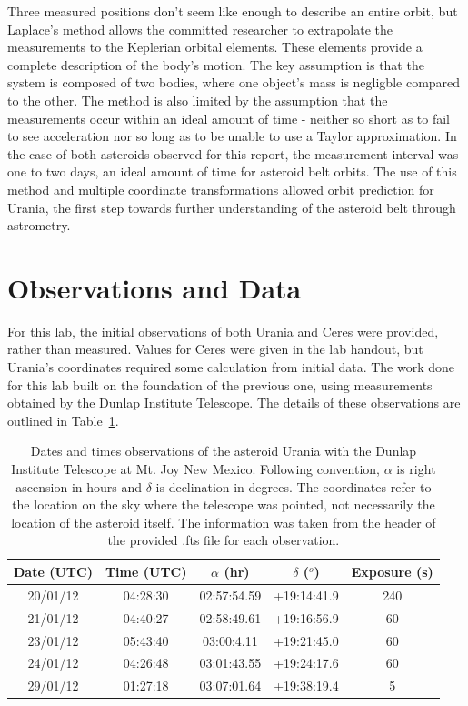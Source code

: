 \documentclass[a4paper,12pt]{article}
\begin{document}
Three measured positions don't seem like enough to describe an entire orbit, but Laplace's method allows the committed researcher to extrapolate the measurements to the Keplerian orbital elements. These elements provide a complete description of the body's motion. The key assumption is that the system is composed of two bodies, where one object's mass is negligble compared to the other. The method is also limited by the assumption that the measurements occur within an ideal amount of time - neither so short as to fail to see acceleration nor so long as to be unable to use a Taylor approximation. In the case of both asteroids observed for this report, the measurement interval was one to two days, an ideal amount of time for asteroid belt orbits. The use of this method and multiple coordinate transformations allowed orbit prediction for Urania, the first step towards further understanding of the asteroid belt through astrometry.


\section{Observations and Data}
\label{sec:obs}

For this lab, the initial observations of both Urania and Ceres were provided, rather than measured. Values for Ceres were given in the lab handout, but Urania's coordinates required some calculation from initial data. The work done for this lab built on the foundation of the previous one, using measurements obtained by the Dunlap Institute Telescope. The details of these observations are outlined in Table~\ref{tab:datatable}.

\begin{table}[!htbp]
  \centering
  \begin{tabular}{|c||c||c||c||c|}
  \hline
   Date (UTC) & Time (UTC) & $\alpha$ (hr) & $\delta$ ($^o$) & Exposure (s) \\
   \hline
   \hline
   20/01/12 & 04:28:30 & 02:57:54.59 & +19:14:41.9 & 240\\
   \hline
   21/01/12 & 04:40:27 & 02:58:49.61 & +19:16:56.9 & 60\\
   \hline
   23/01/12 & 05:43:40 & 03:00:4.11 & +19:21:45.0 & 60 \\
   \hline
   24/01/12 & 04:26:48 & 03:01:43.55 & +19:24:17.6 & 60 \\
   \hline
   29/01/12 & 01:27:18 & 03:07:01.64 & +19:38:19.4 & 5\\
   \hline
   \end{tabular}
    \caption{Dates and times observations of the asteroid Urania with the Dunlap Institute Telescope at Mt. Joy New Mexico. Following convention, $\alpha$ is right ascension in hours and $\delta$ is declination in degrees. The coordinates refer to the location on the sky where the telescope was pointed, not necessarily the location of the asteroid itself. The information was taken from the header of the provided .fts file for each observation.}
    \label{tab:datatable}
\end{table}
\end{document}
